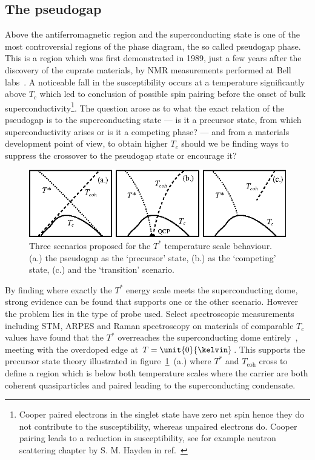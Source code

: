 \subsection{The pseudogap}

Above the antiferromagnetic region and the superconducting state is one of the most controversial regions of the phase diagram, the so called pseudogap phase. This is a region which was first demonstrated in 1989, just a few years after the discovery of the cuprate materials, by \ac{NMR} measurements performed at Bell labs~\cite{Warren1989}. A noticeable fall in the susceptibility occurs at a temperature significantly above $T_c$ which led to conclusion of possible spin pairing before the onset of bulk superconductivity\footnote{Cooper paired electrons in the singlet state have zero net spin hence they do not contribute to the susceptibility, whereas unpaired electrons do. Cooper pairing leads to a reduction in susceptibility, see for example neutron scattering chapter by S. M. Hayden in ref.~\cite{Hayden}}. The question arose as to what the exact relation of the pseudogap is to the superconducting state --- is it a precursor state, from which superconductivity arises or is it a competing phase? --- and from a materials development point of view, to obtain higher $T_c$ should we be finding ways to suppress the crossover to the pseudogap state or encourage it?
\begin{figure}[htbp]
    \begin{center}
        \includegraphics[scale=1.3]{Chapter-Introduction/Figures/PGScenarios/PGScenarios}
        \caption{Three scenarios proposed for the $T^*$ temperature scale behaviour. (a.) the pseudogap as the `precursor' state, (b.) as the `competing' state, (c.) and the `transition' scenario.}
        \label{Fig:Intro:PGScenario}
    \end{center}
\end{figure}
By finding where exactly the $T^*$ energy scale meets the superconducting dome, strong evidence can be found that supports one or the other scenario. However the problem lies in the type of probe used. Select spectroscopic measurements including \ac{STM}, \ac{ARPES} and Raman spectroscopy on materials of comparable $T_c$ values have found that the $T^*$ overreaches the superconducting dome entirely~\cite{Hufner2008}, meeting with the overdoped edge at $T=\unit{0}{\kelvin}$. This supports the precursor state theory illustrated in figure~\ref{Fig:Intro:PGScenario}~(a.) where $T^*$ and $T_{\textrm{coh}}$ cross to define a region which is below both temperature scales where the carrier are both coherent quasiparticles and paired leading to the superconducting condensate.

